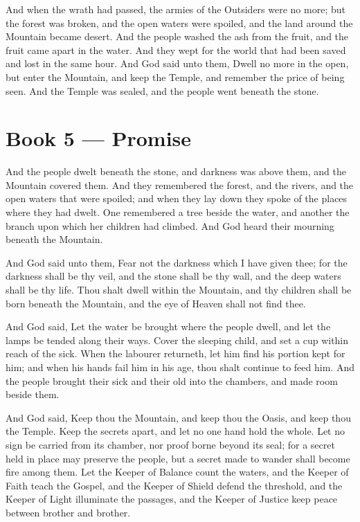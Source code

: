 And when the wrath had passed, the armies of the Outsiders were no more; but the forest was broken, and the open waters were spoiled, and the land around the Mountain became desert. And the people washed the ash from the fruit, and the fruit came apart in the water. And they wept for the world that had been saved and lost in the same hour. And God said unto them, Dwell no more in the open, but enter the Mountain, and keep the Temple, and remember the price of being seen. And the Temple was sealed, and the people went beneath the stone.

\section*{Book 5 --- Promise}

And the people dwelt beneath the stone, and darkness was above them, and the Mountain covered them. And they remembered the forest, and the rivers, and the open waters that were spoiled; and when they lay down they spoke of the places where they had dwelt. One remembered a tree beside the water, and another the branch upon which her children had climbed. And God heard their mourning beneath the Mountain.

And God said unto them, Fear not the darkness which I have given thee; for the darkness shall be thy veil, and the stone shall be thy wall, and the deep waters shall be thy life. Thou shalt dwell within the Mountain, and thy children shall be born beneath the Mountain, and the eye of Heaven shall not find thee.

And God said, Let the water be brought where the people dwell, and let the lamps be tended along their ways. Cover the sleeping child, and set a cup within reach of the sick. When the labourer returneth, let him find his portion kept for him; and when his hands fail him in his age, thou shalt continue to feed him. And the people brought their sick and their old into the chambers, and made room beside them.

And God said, Keep thou the Mountain, and keep thou the Oasis, and keep thou the Temple. Keep the secrets apart, and let no one hand hold the whole. Let no sign be carried from its chamber, nor proof borne beyond its seal; for a secret held in place may preserve the people, but a secret made to wander shall become fire among them. Let the Keeper of Balance count the waters, and the Keeper of Faith teach the Gospel, and the Keeper of Shield defend the threshold, and the Keeper of Light illuminate the passages, and the Keeper of Justice keep peace between brother and brother.

